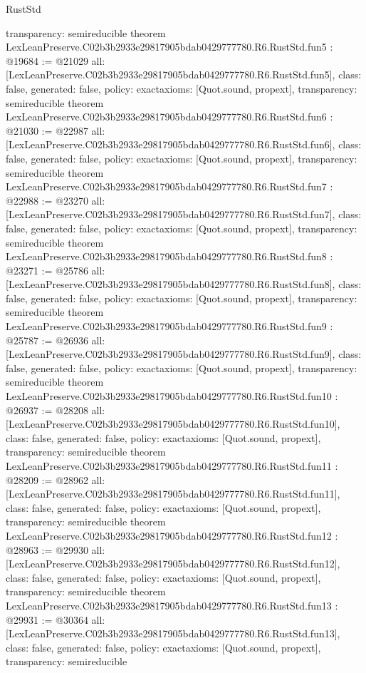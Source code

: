 \begin{lexlean}{RustStd}
\begin{coremodule}
{  transparency: semireducible
}
theorem LexLeanPreserve.C02b3b2933e29817905bdab0429777780.R6.RustStd.fun5 : @19684 := @21029 {
  all: [LexLeanPreserve.C02b3b2933e29817905bdab0429777780.R6.RustStd.fun5],
  class: false,
  generated: false,
  policy: exact{axioms: [Quot.sound, propext]},
  transparency: semireducible
}
theorem LexLeanPreserve.C02b3b2933e29817905bdab0429777780.R6.RustStd.fun6 : @21030 := @22987 {
  all: [LexLeanPreserve.C02b3b2933e29817905bdab0429777780.R6.RustStd.fun6],
  class: false,
  generated: false,
  policy: exact{axioms: [Quot.sound, propext]},
  transparency: semireducible
}
theorem LexLeanPreserve.C02b3b2933e29817905bdab0429777780.R6.RustStd.fun7 : @22988 := @23270 {
  all: [LexLeanPreserve.C02b3b2933e29817905bdab0429777780.R6.RustStd.fun7],
  class: false,
  generated: false,
  policy: exact{axioms: [Quot.sound, propext]},
  transparency: semireducible
}
theorem LexLeanPreserve.C02b3b2933e29817905bdab0429777780.R6.RustStd.fun8 : @23271 := @25786 {
  all: [LexLeanPreserve.C02b3b2933e29817905bdab0429777780.R6.RustStd.fun8],
  class: false,
  generated: false,
  policy: exact{axioms: [Quot.sound, propext]},
  transparency: semireducible
}
theorem LexLeanPreserve.C02b3b2933e29817905bdab0429777780.R6.RustStd.fun9 : @25787 := @26936 {
  all: [LexLeanPreserve.C02b3b2933e29817905bdab0429777780.R6.RustStd.fun9],
  class: false,
  generated: false,
  policy: exact{axioms: [Quot.sound, propext]},
  transparency: semireducible
}
theorem LexLeanPreserve.C02b3b2933e29817905bdab0429777780.R6.RustStd.fun10 : @26937 := @28208 {
  all: [LexLeanPreserve.C02b3b2933e29817905bdab0429777780.R6.RustStd.fun10],
  class: false,
  generated: false,
  policy: exact{axioms: [Quot.sound, propext]},
  transparency: semireducible
}
theorem LexLeanPreserve.C02b3b2933e29817905bdab0429777780.R6.RustStd.fun11 : @28209 := @28962 {
  all: [LexLeanPreserve.C02b3b2933e29817905bdab0429777780.R6.RustStd.fun11],
  class: false,
  generated: false,
  policy: exact{axioms: [Quot.sound, propext]},
  transparency: semireducible
}
theorem LexLeanPreserve.C02b3b2933e29817905bdab0429777780.R6.RustStd.fun12 : @28963 := @29930 {
  all: [LexLeanPreserve.C02b3b2933e29817905bdab0429777780.R6.RustStd.fun12],
  class: false,
  generated: false,
  policy: exact{axioms: [Quot.sound, propext]},
  transparency: semireducible
}
theorem LexLeanPreserve.C02b3b2933e29817905bdab0429777780.R6.RustStd.fun13 : @29931 := @30364 {
  all: [LexLeanPreserve.C02b3b2933e29817905bdab0429777780.R6.RustStd.fun13],
  class: false,
  generated: false,
  policy: exact{axioms: [Quot.sound, propext]},
  transparency: semireducible
}
\end{coremodule}
\end{lexlean}
